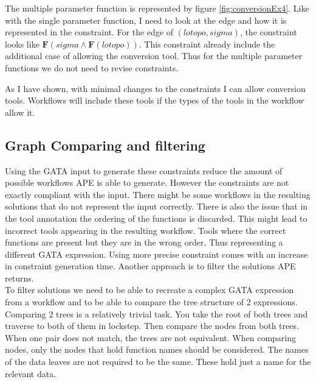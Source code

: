 \documentclass{article}
\begin{document}
 The multiple parameter function is represented by figure \ref{fig:conversionEx4}. Like with the single parameter function, I need to look at the edge and how it is represented in the constraint. For the edge of $(lotopo,sigma)$, the constraint looks like $\textbf{F}(sigma \wedge \textbf{F}(lotopo))$. This constraint already include the additional case of allowing the conversion tool. Thus for the multiple parameter functions we do not need to revise constraints. 
 
As I have shown, with minimal changes to the constraints I can allow conversion tools. Workflows will include these tools if the types of the tools in the workflow allow it.
 
 
 
 


\subsection{Graph Comparing and filtering}
Using the GATA input to generate these constraints reduce the amount of possible workflows APE is able to generate. However the constraints are not exactly compliant with the input. There might be some workflows in the resulting solutions that do not represent the input correctly. There is also the issue that in the tool annotation the ordering of the functions is discarded. This might lead to incorrect tools appearing in the resulting workflow. Tools where the correct functions are present but they are in the wrong order. Thus representing a different GATA expression. Using more precise constraint comes with an increase in constraint generation time. Another approach is to filter the solutions APE returns. 
\\

To filter solutions we need to be able to recreate a complex GATA expression from a workflow and to be able to compare the tree structure of 2 expressions. Comparing 2 trees is a relatively trivial task. You take the root of both trees and traverse to both of them in lockstep. Then compare the nodes from both trees. When one pair does not match, the trees are not equivalent. When comparing nodes, only the nodes that hold function names should be considered. The names of the data leaves are not required to be the same. These hold just a name for the relevant data. \\
\end{document}
